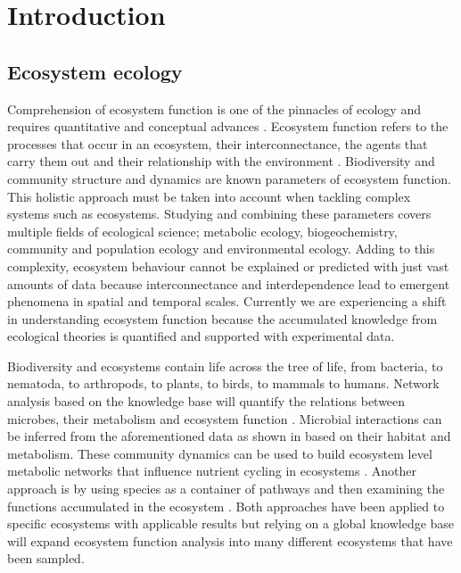 % 
% 

\chapter{Introduction}
\label{cha:intro}

\section{Ecosystem ecology}
\label{sec:intro-ecosystem}

Comprehension of ecosystem function is one of the pinnacles of ecology and
requires quantitative and conceptual advances \parencite{Chapin_Matson_Vitousek_2011}.
Ecosystem function refers to the processes that occur in an ecosystem, their
interconnectance, the agents that carry them out
and their relationship with the environment \parencite{Chapin_Matson_Vitousek_2011}. Biodiversity
\parencite{hooperEFFECTSBIODIVERSITYECOSYSTEM2005, loreau2001Biodiversity}
and community structure and dynamics \parencite{gonze2018Microbial,morris2020linking}
are known parameters of ecosystem function. This holistic approach must be taken
into account when tackling complex systems such as ecosystems. Studying and
combining these parameters covers multiple fields of ecological science;
metabolic ecology, biogeochemistry, community and population ecology and
environmental ecology. Adding to this complexity, ecosystem behaviour cannot be
explained or predicted with just vast amounts of data because interconnectance
and interdependence lead to emergent phenomena in spatial and temporal scales.
Currently we are experiencing a shift in understanding ecosystem function
because the accumulated knowledge from ecological theories is quantified and
supported with experimental data.

Biodiversity and ecosystems contain life across the tree of life, from
bacteria, to nematoda, to arthropods, to plants, to birds, to mammals to 
humans. Network analysis based on the knowledge base will quantify the relations
between microbes, their metabolism and ecosystem
function \parencite{graham2016Microbes,muller2018Using, perez_garcia2016Metabolic}.
Microbial interactions can be inferred from the aforementioned data as shown
in \parencite{machado2021Polarization} based on their habitat and metabolism.
These community dynamics can be used to build ecosystem level metabolic
networks \parencite{perez_garcia2016Metabolic} that influence nutrient cycling in
ecosystems \parencite{bauer2018Network}. Another approach is by using species as a
container of pathways and then examining the functions accumulated in the
ecosystem \parencite{loucaDecouplingFunctionTaxonomy2016}. Both approaches have
been applied to specific ecosystems with applicable results but relying on a
global knowledge base will expand ecosystem function analysis into many
different ecosystems that have been sampled.

